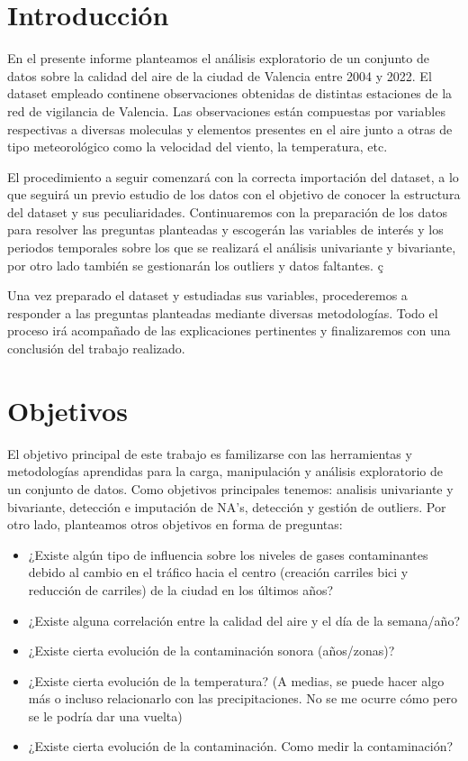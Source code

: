 \documentclass[notspecified,article,submit,moreauthors,pdftex]{Definitions/mdpi}
\begin{document}

\hypertarget{introducciuxf3n}{%
\section{Introducción}\label{introducciuxf3n}}

En el presente informe planteamos el análisis exploratorio de un
conjunto de datos sobre la calidad del aire de la ciudad de Valencia
entre 2004 y 2022. El dataset empleado continene observaciones obtenidas
de distintas estaciones de la red de vigilancia de Valencia. Las
observaciones están compuestas por variables respectivas a diversas
moleculas y elementos presentes en el aire junto a otras de tipo
meteorológico como la velocidad del viento, la temperatura, etc.

El procedimiento a seguir comenzará con la correcta importación del
dataset, a lo que seguirá un previo estudio de los datos con el objetivo
de conocer la estructura del dataset y sus peculiaridades. Continuaremos
con la preparación de los datos para resolver las preguntas planteadas y
escogerán las variables de interés y los periodos temporales sobre los
que se realizará el análisis univariante y bivariante, por otro lado
también se gestionarán los outliers y datos faltantes. ç

Una vez preparado el dataset y estudiadas sus variables, procederemos a
responder a las preguntas planteadas mediante diversas metodologías.
Todo el proceso irá acompañado de las explicaciones pertinentes y
finalizaremos con una conclusión del trabajo realizado.

\hypertarget{objetivos}{%
\section{Objetivos}\label{objetivos}}

El objetivo principal de este trabajo es familizarse con las
herramientas y metodologías aprendidas para la carga, manipulación y
análisis exploratorio de un conjunto de datos. Como objetivos
principales tenemos: analisis univariante y bivariante, detección e
imputación de NA's, detección y gestión de outliers. Por otro lado,
planteamos otros objetivos en forma de preguntas:

\begin{itemize}
\item
  ¿Existe algún tipo de influencia sobre los niveles de gases
  contaminantes debido al cambio en el tráfico hacia el centro (creación
  carriles bici y reducción de carriles) de la ciudad en los últimos
  años?
\item
  ¿Existe alguna correlación entre la calidad del aire y el día de la
  semana/año?
\item
  ¿Existe cierta evolución de la contaminación sonora (años/zonas)?
\item
  ¿Existe cierta evolución de la temperatura? (A medias, se puede hacer
  algo más o incluso relacionarlo con las precipitaciones. No se me
  ocurre cómo pero se le podría dar una vuelta)
\item
  ¿Existe cierta evolución de la contaminación. Como medir la
  contaminación?
\end{itemize}
\end{document}
